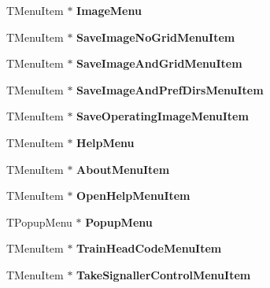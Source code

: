 \begin{DoxyCompactItemize}
T\+Menu\+Item $\ast$ {\bfseries Image\+Menu}
\item 
\mbox{\label{class_t_interface_a2b553b68656ac9d2398bf796cad8bace}} 
T\+Menu\+Item $\ast$ {\bfseries Save\+Image\+No\+Grid\+Menu\+Item}
\item 
\mbox{\label{class_t_interface_aef6c1bcfb0fdba0e490b2f60cc39a1b5}} 
T\+Menu\+Item $\ast$ {\bfseries Save\+Image\+And\+Grid\+Menu\+Item}
\item 
\mbox{\label{class_t_interface_ad02063279ff7f65971612a10a6852f38}} 
T\+Menu\+Item $\ast$ {\bfseries Save\+Image\+And\+Pref\+Dirs\+Menu\+Item}
\item 
\mbox{\label{class_t_interface_a55fa81c120a7b449b927e9243cf13261}} 
T\+Menu\+Item $\ast$ {\bfseries Save\+Operating\+Image\+Menu\+Item}
\item 
\mbox{\label{class_t_interface_a9754392369386385a52c45747774c408}} 
T\+Menu\+Item $\ast$ {\bfseries Help\+Menu}
\item 
\mbox{\label{class_t_interface_a8b725a9474aad77174fdf8e44b285b98}} 
T\+Menu\+Item $\ast$ {\bfseries About\+Menu\+Item}
\item 
\mbox{\label{class_t_interface_a6cdce7bb8a495891ca9aebdec811eea7}} 
T\+Menu\+Item $\ast$ {\bfseries Open\+Help\+Menu\+Item}
\item 
\mbox{\label{class_t_interface_ac0962233c50c6c67c55b71b54b634b9b}} 
T\+Popup\+Menu $\ast$ {\bfseries Popup\+Menu}
\item 
\mbox{\label{class_t_interface_a4f47c7fbc5c7fed553660681e9a9db13}} 
T\+Menu\+Item $\ast$ {\bfseries Train\+Head\+Code\+Menu\+Item}
\item 
\mbox{\label{class_t_interface_aba33f688c4d29b90e6199ebbc3ec915a}} 
T\+Menu\+Item $\ast$ {\bfseries Take\+Signaller\+Control\+Menu\+Item}
\item 
\mbox{\label{class_t_interface_a98a1985536936cdcc54066e7c9c51752}} 

\end{DoxyCompactItemize}
